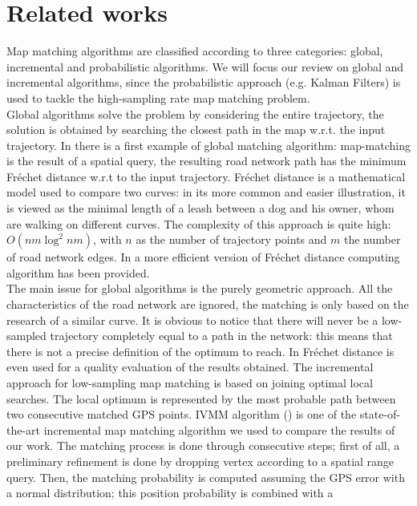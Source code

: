 \documentclass[5p]{elsarticle}
\begin{document}
\section{Related works}
Map matching algorithms are classified according to three categories: global, incremental and probabilistic algorithms. We will focus our
review on global and incremental algorithms, since the probabilistic approach (e.g. Kalman Filters) is used to tackle the high-sampling rate map matching problem. \\
Global algorithms solve the problem by considering the entire trajectory, the solution is obtained by searching the closest path in the map w.r.t. the input trajectory.
In \cite{alt2003matching} there is a first example of global matching algorithm: map-matching is the result of a spatial query, the resulting road network path has the
 minimum Fréchet distance w.r.t to the input trajectory. Fréchet distance is a mathematical model 
used to compare two curves: in its more common and easier illustration, 
it is viewed as the minimal length of a leash between a dog and his owner, whom are walking on different curves. The complexity of this approach is quite high: $O(nm\log^2nm)$, with $n$ as the number of trajectory points and $m$ the number of road network edges.
In \cite{chen2011approximate} a more efficient version of Fréchet distance computing algorithm has been provided. \\
The main issue for global algorithms is the purely geometric approach. All the characteristics of the road network are ignored, the matching is only based on the research
 of a similar curve. It is obvious to notice that there will never be a low-sampled trajectory completely equal to a path in the network: this means that there is not a precise definition of the optimum to reach. 
In \cite{brakatsoulas2005map} Fréchet distance is even used for a quality evaluation of the results obtained.
The incremental approach for low-sampling map matching is based on joining optimal local searches. The local optimum is represented by the most probable path between two 
consecutive matched GPS points. 
IVMM algorithm (\cite{yuan2010interactive}) is one of the state-of-the-art incremental map matching algorithm we used to compare the results of our work. The matching 
process is done through consecutive steps; first of all, a preliminary refinement is done by dropping vertex according 
to a spatial range query. Then, the matching probability is computed assuming the GPS error with a normal distribution; this position probability is combined with a 
\end{document}
